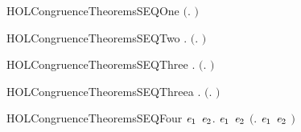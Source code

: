 \newcommand{\HOLCongruenceTheoremsPCCXXisXXcoarsest}{\UseVerbatim{HOLCongruenceTheoremsPCCXXisXXcoarsest}}
\begin{SaveVerbatim}{HOLCongruenceTheoremsSEQOne}
\HOLTokenTurnstile{}  \ensuremath{(}\HOLTokenLambda{}. \ensuremath{)}
\end{SaveVerbatim}
\newcommand{\HOLCongruenceTheoremsSEQOne}{\UseVerbatim{HOLCongruenceTheoremsSEQOne}}
\begin{SaveVerbatim}{HOLCongruenceTheoremsSEQTwo}
\HOLTokenTurnstile{} \HOLSymConst{\HOLTokenForall{}}.  \ensuremath{(}\HOLTokenLambda{}. \ensuremath{)}
\end{SaveVerbatim}
\newcommand{\HOLCongruenceTheoremsSEQTwo}{\UseVerbatim{HOLCongruenceTheoremsSEQTwo}}
\begin{SaveVerbatim}{HOLCongruenceTheoremsSEQThree}
\HOLTokenTurnstile{} \HOLSymConst{\HOLTokenForall{}} .   \HOLSymConst{\HOLTokenImp{}}  \ensuremath{(}\HOLTokenLambda{}. \HOLSymConst{\ensuremath{\ldotp}} \ensuremath{)}
\end{SaveVerbatim}
\newcommand{\HOLCongruenceTheoremsSEQThree}{\UseVerbatim{HOLCongruenceTheoremsSEQThree}}
\begin{SaveVerbatim}{HOLCongruenceTheoremsSEQThreea}
\HOLTokenTurnstile{} \HOLSymConst{\HOLTokenForall{}}.  \ensuremath{(}\HOLTokenLambda{}. \HOLSymConst{\ensuremath{\ldotp}}\ensuremath{)}
\end{SaveVerbatim}
\newcommand{\HOLCongruenceTheoremsSEQThreea}{\UseVerbatim{HOLCongruenceTheoremsSEQThreea}}
\begin{SaveVerbatim}{HOLCongruenceTheoremsSEQFour}
\HOLTokenTurnstile{} \HOLSymConst{\HOLTokenForall{}}\ensuremath{\HOLBoundVar{e}\sb{\mathrm{1}}} \ensuremath{\HOLBoundVar{e}\sb{\mathrm{2}}}.  \ensuremath{\HOLBoundVar{e}\sb{\mathrm{1}}} \HOLSymConst{\HOLTokenConj{}}  \ensuremath{\HOLBoundVar{e}\sb{\mathrm{2}}} \HOLSymConst{\HOLTokenImp{}}  \ensuremath{(}\HOLTokenLambda{}. \ensuremath{\HOLBoundVar{e}\sb{\mathrm{1}}}  \HOLSymConst{\ensuremath{+}} \ensuremath{\HOLBoundVar{e}\sb{\mathrm{2}}} \ensuremath{)}
\end{SaveVerbatim}
\newcommand{\HOLCongruenceTheoremsSEQFour}{\UseVerbatim{HOLCongruenceTheoremsSEQFour}}
